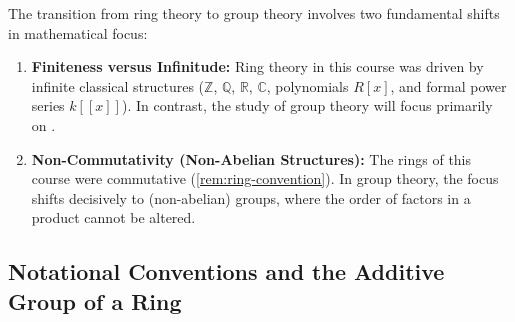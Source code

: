 \begin{content}
The transition from ring theory to group theory involves two fundamental shifts in mathematical focus:
\begin{enumerate}[label=\textbf{(\arabic*)}]
    \item \textbf{Finiteness versus Infinitude:} Ring theory in this course was driven by infinite classical structures ($\mathbb{Z}$, $\mathbb{Q}$, $\mathbb{R}$, $\mathbb{C}$, polynomials $R[x]$, and formal power series $k[[x]]$). In contrast, the study of group theory will focus primarily on .
    \item \textbf{Non-Commutativity (Non-Abelian Structures):} The rings of this course were commutative (\cref{rem:ring-convention}). In group theory, the focus shifts decisively to  (non-abelian) groups, where the order of factors in a product cannot be altered.
\end{enumerate}
\end{content}

\subsection{Notational Conventions and the Additive Group of a Ring}

